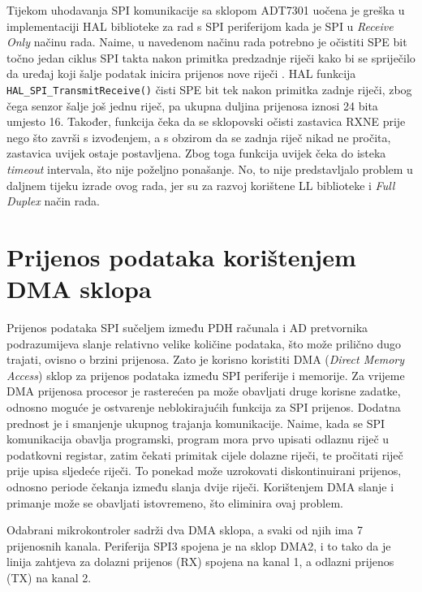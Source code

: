 Tijekom uhodavanja SPI komunikacije sa sklopom ADT7301 uočena je greška u implementaciji HAL biblioteke za rad s SPI periferijom kada je SPI u \textit{Receive Only} načinu rada. Naime, u navedenom načinu rada potrebno je očistiti SPE bit točno jedan ciklus SPI takta nakon primitka predzadnje riječi kako bi se spriječilo da uređaj koji šalje podatak inicira prijenos nove riječi \cite[str.~894]{stm32f4_manual}. HAL funkcija \texttt{HAL\_SPI\_TransmitReceive()} čisti SPE bit tek nakon primitka zadnje riječi, zbog čega senzor šalje još jednu riječ, pa ukupna duljina prijenosa iznosi 24 bita umjesto 16. Također, funkcija čeka da se sklopovski očisti zastavica RXNE prije nego što završi s izvođenjem, a s obzirom da se zadnja riječ nikad ne pročita, zastavica uvijek ostaje postavljena. Zbog toga funkcija uvijek čeka do isteka \textit{timeout} intervala, što nije poželjno ponašanje. No, to nije predstavljalo problem u daljnem tijeku izrade ovog rada, jer su za razvoj korištene LL biblioteke i \textit{Full Duplex} način rada.

\section{Prijenos podataka korištenjem DMA sklopa}

Prijenos podataka SPI sučeljem između PDH računala i AD pretvornika podrazumijeva slanje relativno velike količine podataka, što može prilično dugo trajati, ovisno o brzini prijenosa. Zato je korisno koristiti DMA (\textit{Direct Memory Access}) sklop za prijenos podataka između SPI periferije i memorije. Za vrijeme DMA prijenosa procesor je rasterećen pa može obavljati druge korisne zadatke, odnosno moguće je ostvarenje neblokirajućih funkcija za SPI prijenos. Dodatna prednost je i smanjenje ukupnog trajanja komunikacije. Naime, kada se SPI komunikacija obavlja programski, program mora prvo upisati odlaznu riječ u podatkovni registar, zatim čekati primitak cijele dolazne riječi, te pročitati riječ prije upisa sljedeće riječi. To ponekad može uzrokovati diskontinuirani prijenos, odnosno periode čekanja između slanja dvije riječi. \cite[str.~890]{stm32f4_manual} Korištenjem DMA slanje i primanje može se obavljati istovremeno, što eliminira ovaj problem.

Odabrani mikrokontroler sadrži dva DMA sklopa, a svaki od njih ima 7 prijenosnih kanala. Periferija SPI3 spojena je na sklop DMA2, i to tako da je linija zahtjeva za dolazni prijenos (RX) spojena na kanal 1, a odlazni prijenos (TX) na kanal 2. 

